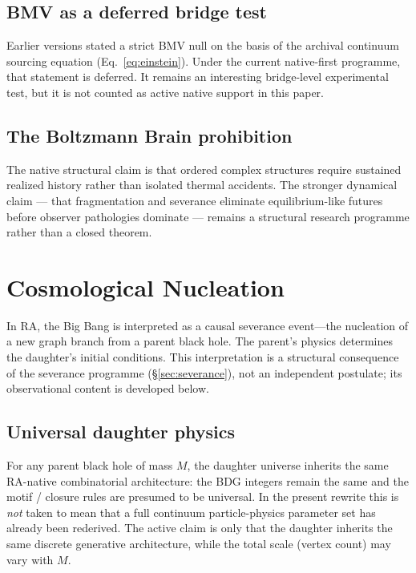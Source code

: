 \documentclass[11pt]{article}
\begin{document}
\subsection{BMV as a deferred bridge test}

Earlier versions stated a strict BMV null on the basis of the archival continuum sourcing equation (Eq.~\ref{eq:einstein}). Under the current native-first programme, that statement is deferred. It remains an interesting bridge-level experimental test, but it is not counted as active native support in this paper.

\subsection{The Boltzmann Brain prohibition}

The native structural claim is that ordered complex structures require sustained realized history rather than isolated thermal accidents. The stronger dynamical claim --- that fragmentation and severance eliminate equilibrium-like futures before observer pathologies dominate --- remains a structural research programme rather than a closed theorem.

\section{Cosmological Nucleation}
\label{sec:nucleation}

In RA, the Big Bang is interpreted as a causal severance event---the nucleation of a new graph branch from a parent black hole. The parent's physics determines the daughter's initial conditions. This interpretation is a structural consequence of the severance programme (\S\ref{sec:severance}), not an independent postulate; its observational content is developed below.

\subsection{Universal daughter physics}

For any parent black hole of mass $M$, the daughter universe inherits the same RA-native combinatorial architecture: the BDG integers remain the same and the motif / closure rules are presumed to be universal. In the present rewrite this is \emph{not} taken to mean that a full continuum particle-physics parameter set has already been rederived. The active claim is only that the daughter inherits the same discrete generative architecture, while the total scale (vertex count) may vary with $M$.
\end{document}
